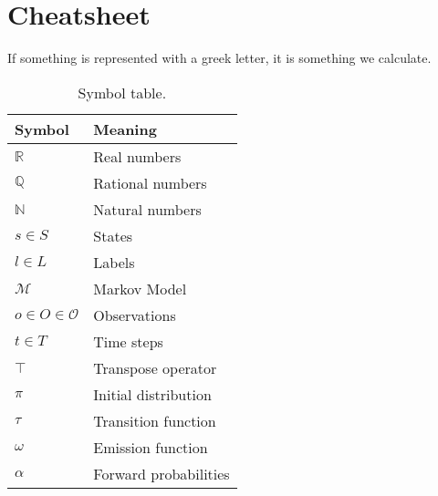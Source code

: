 \section{Cheatsheet}\label{sec:cheatsheet}
If something is represented with a greek letter, it is something we calculate.

\begin{table}[htb!]
    \centering
    \caption{Symbol table.}
    \begin{tabular}{ll}
        \toprule
        \textbf{Symbol}                 & \textbf{Meaning}                                \\
        \midrule
        $\mathbb{R}$                    & Real numbers                                    \\
        $\mathbb{Q}$                    & Rational numbers                                \\
        $\mathbb{N}$                    & Natural numbers                                 \\
        $s \in S$                       & States                                          \\
        $l \in L$                       & Labels                                          \\
        $\mathcal{M}$                   & Markov Model                                    \\
        $o \in O \in \mathcal{O}$       & Observations                                    \\
        $t \in T$                       & Time steps                                      \\
        $\top$                          & Transpose operator                              \\
        $\pi$                           & Initial distribution                            \\
        $\tau$                          & Transition function                             \\
        $\omega$                        & Emission function                               \\
        $\alpha$                        & Forward probabilities                           \\

\end{tabular}
\end{table}
